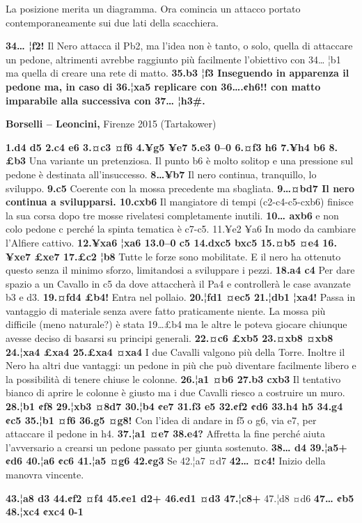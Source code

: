 La posizione merita un diagramma. Ora comincia un attacco portato
contemporaneamente sui due lati della scacchiera.


\textbf{34\ldots{} ¦f2!} Il Nero attacca il Pb2, ma l'idea non è tanto,
o solo, quella di attaccare un pedone, altrimenti avrebbe raggiunto più
facilmente l'obiettivo con 34\ldots{} ¦b1 ma quella di creare una rete
di matto. \textbf{35.b3 ¦f3 Inseguendo in apparenza il pedone ma, in
caso di 36.¦xa5 replicare con 36\ldots.¢h6!! con matto imparabile alla
successiva con 37\ldots{} ¦h3\#.}

\textbf{Borselli -- Leoncini,} Firenze 2015 (Tartakower)

\textbf{1.d4 d5 2.c4 e6 3.¤c3 ¤f6 4.¥g5 ¥e7 5.e3 0--0 6.¤f3 h6 7.¥h4 b6
8.£b3} Una variante un pretenziosa. Il punto b6 è molto solitop e una
pressione sul pedone è destinata all'insuccesso. \textbf{8\ldots ¥b7} Il
nero continua, tranquillo, lo sviluppo. \textbf{9.c5} Coerente con la
mossa precedente ma sbagliata. \textbf{9\ldots ¤bd7 Il nero continua a
svilupparsi. 10.cxb6} Il mangiatore di tempi (c2-c4-c5-cxb6) finisce la
sua corsa dopo tre mosse rivelatesi completamente inutili.
\textbf{10\ldots{} axb6} e non colo pedone c perché la spinta tematica è
c7-c5. 11.¥e2 ¥a6 In modo da cambiare l'Alfiere cattivo. \textbf{12.¥xa6
¦xa6 13.0--0 c5 14.dxc5 bxc5 15.¤b5 ¤e4 16.¥xe7 £xe7 17.£c2 ¦b8} Tutte
le forze sono mobilitate. E il nero ha ottenuto questo senza il minimo
sforzo, limitandosi a sviluppare i pezzi. \textbf{18.a4 c4} Per dare
spazio a un Cavallo in c5 da dove attaccherà il Pa4 e controllerà le
case avanzate b3 e d3. \textbf{19.¤fd4 £b4!} Entra nel pollaio.
\textbf{20.¦fd1 ¤ec5 21.¦db1 ¦xa4!} Passa in vantaggio di materiale
senza avere fatto praticamente niente. La mossa più difficile (meno
naturale?) è stata 19\ldots £b4 ma le altre le poteva giocare chiunque
avesse deciso di basarsi su principi generali. \textbf{22.¤c6 £xb5
23.¤xb8 ¤xb8 24.¦xa4 £xa4 25.£xa4 ¤xa4} I due Cavalli valgono più della
Torre. Inoltre il Nero ha altri due vantaggi: un pedone in più che può
diventare facilmente libero e la possibilità di tenere chiuse le
colonne. \textbf{26.¦a1 ¤b6 27.b3 cxb3} Il tentativo bianco di aprire le
colonne è giusto ma i due Cavalli riesco a costruire un muro.
\textbf{28.¦b1 ¢f8 29.¦xb3 ¤8d7 30.¦b4 ¢e7 31.f3 e5 32.¢f2 ¢d6 33.h4 h5
34.g4 ¢c5 35.¦b1 ¤f6 36.g5 ¤g8!} Con l'idea di andare in f5 o g6, via
e7, per attaccare il pedone in h4. \textbf{37.¦a1 ¤e7 38.e4?} Affretta
la fine perché aiuta l'avversario a crearsi un pedone passato per giunta
sostenuto. \textbf{38\ldots{} d4 39.¦a5+ ¢d6 40.¦a6 ¢c6 41.¦a5 ¤g6
42.¢g3} Se 42.¦a7 ¤d7 \textbf{42\ldots{} ¤c4!} Inizio della manovra
vincente.


\textbf{43.¦a8 d3 44.¢f2 ¤f4 45.¢e1 d2+ 46.¢d1 ¤d3 47.¦c8+} 47.¦d8 ¤d6
\textbf{47\ldots{} ¢b5 48.¦xc4 ¢xc4 0-1}

